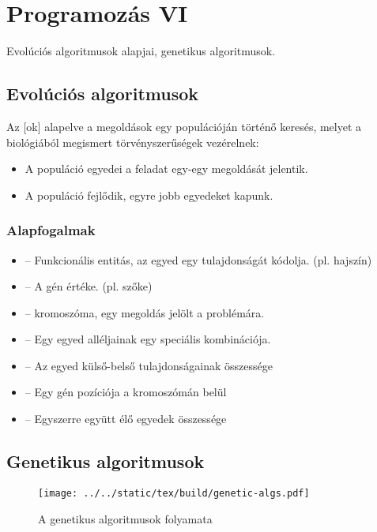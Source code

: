 \documentclass[../../main.tex]{subfiles}
\begin{document}
\section{Programozás VI}

\begin{fulltheorem}
  Evolúciós algoritmusok alapjai, genetikus algoritmusok.
\end{fulltheorem}

\subsection{Evolúciós algoritmusok}

Az [ok] alapelve a megoldások egy populációján
történő keresés, melyet a biológiából megismert törvényszerűségek vezérelnek:
\begin{itemize}
  \item A populáció egyedei a feladat egy-egy megoldását jelentik.
  \item A populáció fejlődik, egyre jobb egyedeket kapunk.
\end{itemize}

\subsubsection{Alapfogalmak}

\begin{itemize}
  \item {} -- Funkcionális entitás, az egyed egy tulajdonságát kódolja.
        (pl. hajszín)
  \item {} -- A gén értéke. (pl. szőke)
  \item {} -- kromoszóma, egy megoldás jelölt a problémára.
  \item {} -- Egy egyed alléljainak egy speciális kombinációja.
  \item {} -- Az egyed külső-belső tulajdonságainak összessége
  \item {} -- Egy gén pozíciója a kromoszómán belül
  \item {} -- Egyszerre együtt élő egyedek összessége
\end{itemize}

\subsection{Genetikus algoritmusok}
\begin{figure}[H]
  \centering
  \texttt{[image: ../../static/tex/build/genetic-algs.pdf]}
  \caption{A genetikus algoritmusok folyamata}
  \label{fig:genalg}
\end{figure}
\end{document}
